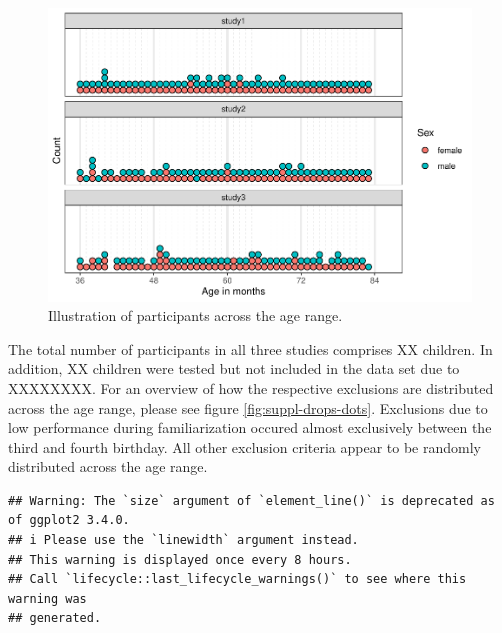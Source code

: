 \documentclass[
  man]{apa6}
\begin{document}
\begin{figure}

{\centering \includegraphics{symlit_rep_manuscript_files/figure-latex/suppl-participants-dots-1} 

}

\caption{Illustration of participants across the age range.}\label{fig:suppl-participants-dots}
\end{figure}

The total number of participants in all three studies comprises XX children. In addition, XX children were tested but not included in the data set due to XXXXXXXX. For an overview of how the respective exclusions are distributed across the age range, please see figure \ref{fig:suppl-drops-dots}. Exclusions due to low performance during familiarization occured almost exclusively between the third and fourth birthday. All other exclusion criteria appear to be randomly distributed across the age range.

\begin{verbatim}
## Warning: The `size` argument of `element_line()` is deprecated as of ggplot2 3.4.0.
## i Please use the `linewidth` argument instead.
## This warning is displayed once every 8 hours.
## Call `lifecycle::last_lifecycle_warnings()` to see where this warning was
## generated.
\end{verbatim}
\end{document}
